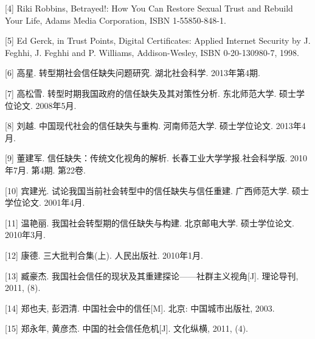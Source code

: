 \documentclass[UTF8]{ctexart}
\begin{document}
    [4] Riki Robbins, Betrayed!: How You Can Restore Sexual Trust and Rebuild Your Life, Adams Media Corporation, ISBN 1-55850-848-1.

    [5] Ed Gerck, in Trust Points, Digital Certificates: Applied Internet Security by J. Feghhi, J. Feghhi and P. Williams, Addison-Wesley, ISBN 0-20-130980-7, 1998.

    [6] 高星. 转型期社会信任缺失问题研究. 湖北社会科学. 2013年第4期.

    [7] 高松雪. 转型时期我国政府的信任缺失及其对策性分析. 东北师范大学. 硕士学位论文. 2008年5月.

    [8] 刘越. 中国现代社会的信任缺失与重构. 河南师范大学. 硕士学位论文. 2013年4月.

    [9] 董建军. 信任缺失：传统文化视角的解析. 长春工业大学学报.社会科学版. 2010年7月. 第4期. 第22卷.

    [10] 宾建光. 试论我国当前社会转型中的信任缺失与信任重建. 广西师范大学. 硕士学位论文. 2001年4月.

    [11] 温艳丽. 我国社会转型期的信任缺失与构建. 北京邮电大学. 硕士学位论文. 2010年3月.

    [12] 康德. 三大批判合集(上). 人民出版社. 2010年1月.

    [13] 臧豪杰. 我国社会信任的现状及其重建探论——社群主义视角[J]. 理论导刊, 2011, (8).

    [14] 郑也夫, 彭泗清. 中国社会中的信任[M]. 北京: 中国城市出版社, 2003.

    [15] 郑永年, 黄彦杰. 中国的社会信任危机[J]. 文化纵横, 2011, (4).
\end{document}
